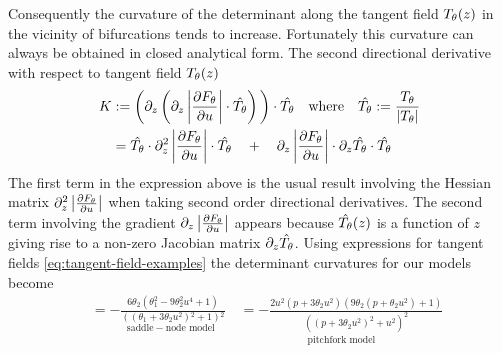 Consequently the curvature of the determinant along the tangent field $T_{\theta}(z)$ in the vicinity of bifurcations tends to increase. Fortunately this curvature can always be obtained in closed analytical form. The second directional derivative with respect to tangent field $T_{\theta}(z)$
\begin{align}
    K &:=
    \bigg(
        \partial_z\left(
            \partial_z\left| \frac{\partial F_{\theta}}{\partial u} \right| \cdot \hat{T_{\theta}}
        \right)
    \bigg)\cdot \hat{T_{\theta}}\quad
    \mathrm{where} \quad \hat{T_{\theta}}:=\frac{T_{\theta}}{|T_{\theta}|}\\
    &=
    \hat{T_{\theta}}\cdot\partial_z^2\left| \frac{\partial F_{\theta}}{\partial u} \right|\cdot\hat{T_{\theta}}
    \quad+\quad
    \partial_z\left| \frac{\partial F_{\theta}}{\partial u} \right|\cdot\partial_z\hat{T_{\theta}}\cdot\hat{T_{\theta}}
\end{align}
The first term in the expression above is the usual result involving the Hessian matrix $\partial_z^2\left| \frac{\partial F_{\theta}}{\partial u} \right|$ when taking second order directional derivatives. The second term involving the gradient $\partial_z\left| \frac{\partial F_{\theta}}{\partial u} \right|$ appears because $\hat{T_{\theta}}(z)$ is a function of $z$ giving rise to a non-zero Jacobian matrix $\partial_z \hat{T_{\theta}}$. Using expressions for tangent fields \eqref{eq:tangent-field-examples} the determinant curvatures for our models become
\begin{align}
    \underset{\qquad\qquad\mathrm{saddle-node\,\,model}}{
    \quad=
    -\frac{6 \theta_2 \left(\theta _1^2-9 \theta _2^2 u^4+1\right)}
    {\left(\left(\theta _1+3 \theta _2 u^2\right){}^2+1\right){}^2}}
    \quad
    \underset{\mathrm{pitchfork\,\,model}}{=
    -\frac{2 u^2 \left(p+3 \theta _2 u^2\right) \left(9 \theta _2 \left(p+\theta _2 u^2\right)+1\right)}{
    ( \left(p+3 \theta _2 u^2\right)^2+u^2 )^2
    }}
    \label{eq:curvature-examples}
\end{align}



